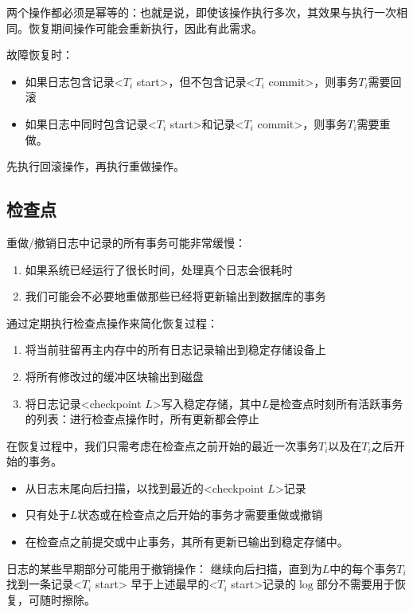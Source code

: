 两个操作都必须是幂等的：也就是说，即使该操作执行多次，其效果与执行一次相同。恢复期间操作可能会重新执行，因此有此需求。

故障恢复时：
\begin{itemize}
    \item 如果日志包含记录<$T_i$ start>，但不包含记录<$T_i$ commit>，则事务$T_i$需要回滚
    \item 如果日志中同时包含记录<$T_i$ start>和记录<$T_i$ commit>，则事务$T_i$需要重做。
\end{itemize}

先执行回滚操作，再执行重做操作。

\subsection{检查点}

重做/撤销日志中记录的所有事务可能非常缓慢：
\begin{enumerate}
    \item 如果系统已经运行了很长时间，处理真个日志会很耗时
    \item 我们可能会不必要地重做那些已经将更新输出到数据库的事务
\end{enumerate}

通过定期执行检查点操作来简化恢复过程：
\begin{enumerate}
    \item 将当前驻留再主内存中的所有日志记录输出到稳定存储设备上
    \item 将所有修改过的缓冲区块输出到磁盘
    \item 将日志记录<checkpoint $L$>写入稳定存储，其中$L$是检查点时刻所有活跃事务的列表：进行检查点操作时，所有更新都会停止
\end{enumerate}

在恢复过程中，我们只需考虑在检查点之前开始的最近一次事务$T_i$以及在$T_i$之后开始的事务。
\begin{itemize}
    \item 从日志末尾向后扫描，以找到最近的<checkpoint $L$>记录 
    \item 只有处于$L$状态或在检查点之后开始的事务才需要重做或撤销
    \item 在检查点之前提交或中止事务，其所有更新已输出到稳定存储中。
\end{itemize}

日志的某些早期部分可能用于撤销操作：
继续向后扫描，直到为$L$中的每个事务$T_i$找到一条记录<$T_i$ start>
早于上述最早的<$T_i$ start>记录的$\log$部分不需要用于恢复，可随时擦除。